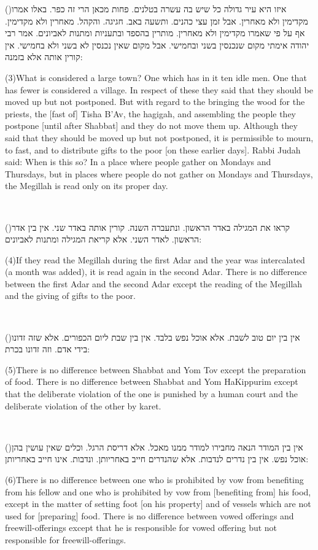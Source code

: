 \documentclass[12pt, openany]{book}
\newcommand{\sethebfont}{
\fontsize{10.5pt}{13.1pt} \selectfont
}
\newcommand{\LTRmark}{‎}
\newcommand{\hebeng}[2]{
	{\sethebfont #1}
	
	{\beginL\englishfont\sethebfont{\raggedright #2 \hfill} \LTRmark\endL}
	
	\vspace{\baselineskip}
}
\newcommand{\vsnum}[1]{(\hebrewnumeral{#1})\space}
\newcommand{\vsnumeng}[1]{(#1)\space}
\begin{document}
\hebeng{\vsnum{3}איזו היא עיר גדולה כל שיש בה עשרה בטלנים. פחות מכאן הרי זה כפר. באלו אמרו מקדימין ולא מאחרין. אבל זמן עצי כהנים. ותשעה באב. חגיגה. והקהל. מאחרין ולא מקדימין. אף על פי שאמרו מקדימין ולא מאחרין. מותרין בהספד ובתעניות ומתנות לאביונים. אמר רבי יהודה אימתי מקום שנכנסין בשני ובחמישי. אבל מקום שאין נכנסין לא בשני ולא בחמישי. אין קורין אותה אלא בזמנה: 
}{\vsnumeng{3}What is considered a large town? One which has in it ten idle men. One that has fewer is considered a village. In respect of these they said that they should be moved up but not postponed. But with regard to the bringing the wood for the priests, the {[fast of]} Tisha B’Av, the hagigah, and assembling the people they postpone {[until after Shabbat]} and they do not move them up. Although they said that they should be moved up but not postponed, it is permissible to mourn, to fast, and to distribute gifts to the poor {[on these earlier days]}. Rabbi Judah said: When is this so? In a place where people gather on Mondays and Thursdays, but in places where people do not gather on Mondays and Thursdays, the Megillah is read only on its proper day.}%

\hebeng{\vsnum{4}קראו את המגילה באדר הראשון. ונתעברה השנה. קורין אותה באדר שני. אין בין אדר הראשון. לאדר השני. אלא קריאת המגילה ומתנות לאביונים: 
}{\vsnumeng{4}If they read the Megillah during the first Adar and the year was intercalated (a month was added), it is read again in the second Adar. There is no difference between the first Adar and the second Adar except the reading of the Megillah and the giving of gifts to the poor.}%

\hebeng{\vsnum{5}אין בין יום טוב לשבת. אלא אוכל נפש בלבד. אין בין שבת ליום הכפורים. אלא שזה זדונו בידי אדם. וזה זדונו בכרת: 
}{\vsnumeng{5}There is no difference between Shabbat and Yom Tov except the preparation of food. There is no difference between Shabbat and Yom HaKippurim except that the deliberate violation of the one is punished by a human court and the deliberate violation of the other by karet.}%

\hebeng{\vsnum{6}אין בין המודר הנאה מחבירו למודר ממנו מאכל. אלא דריסת הרגל. וכלים שאין עושין בהן אוכל נפש. אין בין נדרים לנדבות. אלא שהנדרים חייב באחריותן. ונדבות. אינו חייב באחריותן: 
}{\vsnumeng{6}There is no difference between one who is prohibited by vow from benefiting from his fellow and one who is prohibited by vow from {[benefiting from]} his food, except in the matter of setting foot {[on his property]} and of vessels which are not used for {[preparing]} food. There is no difference between vowed offerings and freewill-offerings except that he is responsible for vowed offering but not responsible for freewill-offerings.}%
\end{document}

